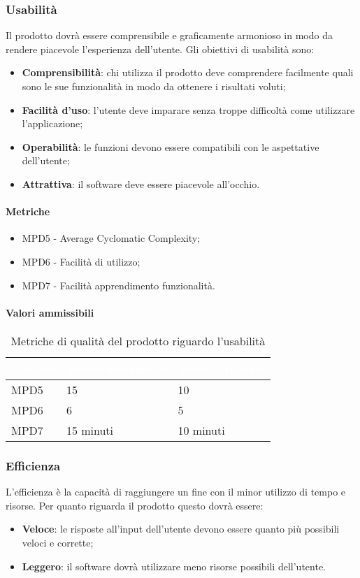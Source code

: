 \subsubsection{Usabilità}
Il prodotto dovrà essere comprensibile e graficamente armonioso in modo da rendere piacevole l'esperienza dell'utente. Gli obiettivi di usabilità sono:
\begin{itemize}
\item \textbf{Comprensibilità}: chi utilizza il prodotto deve comprendere facilmente quali sono le sue funzionalità in modo da ottenere i risultati voluti;
\item \textbf{Facilità d'uso}: l'utente deve imparare senza troppe difficoltà come utilizzare l'applicazione;
\item \textbf{Operabilità}: le funzioni devono essere compatibili con le aspettative dell'utente;
\item \textbf{Attrattiva}: il software deve essere piacevole all'occhio.
\end{itemize} 
\paragraph{Metriche}
\begin{itemize}
\item MPD5 - Average Cyclomatic Complexity;
\item MPD6 - Facilità di utilizzo;
\item MPD7 - Facilità apprendimento funzionalità.
\end{itemize}
\paragraph{Valori ammissibili}
\renewcommand{\arraystretch}{1.5}
\begin{longtable}{C{2.5cm} C{4cm} C{4cm}}
\textcolor{white}{\textbf{Metrica}}&
\textcolor{white}{\textbf{Valore accettabile}}&
\textcolor{white}{\textbf{Valore ottimale}}\\	
\endhead
\endfoot
{}\caption{Metriche di qualità del prodotto riguardo l'usabilità}
\endlastfoot
		MPD5 &  
		15 &
		10 \\		
		MPD6 &  
		6 &
		5 \\
		MPD7 &  
		15 minuti &
		10 minuti\\
\end{longtable}
\subsubsection{Efficienza}
L'efficienza è la capacità di raggiungere un fine con il minor utilizzo di tempo e risorse. Per quanto riguarda il prodotto questo dovrà essere:
\begin{itemize}
\item \textbf{Veloce}: le risposte all'input dell'utente devono essere quanto più possibili veloci e corrette;
\item \textbf{Leggero}: il software dovrà utilizzare meno risorse possibili dell'utente.
\end{itemize}
